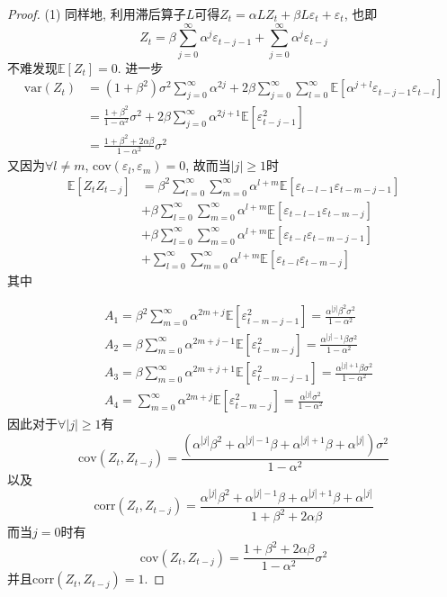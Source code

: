 \documentclass[cn,12pt,math=mtpro2,citestyle=gb7714-2015,bibstyle=gb7714-2015,twocol,mode=simple]{elegantbook}
\newcommand{\E}{\mathbb{E}}
\newcommand{\var}{\text{var}}
\begin{document}
\begin{proof}
  (1) 同样地, 利用滞后算子$L$可得$Z_t=\alpha LZ_t+\beta L\varepsilon_{t}+\varepsilon_t$, 也即
  $$Z_t=\beta\sum_{j=0}^{\infty}\alpha^j\varepsilon_{t-j-1}+\sum_{j=0}^{\infty}\alpha^j\varepsilon_{t-j}$$
  不难发现$\E[Z_t]=0$. 进一步
  \begin{align*}
  \var(Z_t)&=(1+\beta^2)\sigma^2\sum_{j=0}^{\infty}\alpha^{2j}+2\beta\sum_{j=0}^{\infty}\sum_{l=0}^{\infty}\E[\alpha^{j+l}\varepsilon_{t-j-1}\varepsilon_{t-l}] \\
  &=\frac{1+\beta^2}{1-\alpha^2}\sigma^2+2\beta\sum_{j=0}^{\infty}\alpha^{2j+1}\E[\varepsilon^2_{t-j-1}]  \\
  &=\frac{1+\beta^2+2\alpha\beta}{1-\alpha^2}\sigma^2
  \end{align*}
  又因为$\forall l\neq m$, $\text{cov}(\varepsilon_l,\varepsilon_m)=0$, 故而当$|j|\geq1$时
  \begin{align}
  \E[Z_tZ_{t-j}]&=\beta^2\sum_{l=0}^{\infty}\sum_{m=0}^{\infty}\alpha^{l+m}\E[\varepsilon_{t-l-1}\varepsilon_{t-m-j-1}] \tag{$A_1$} \\
  &+\beta\sum_{l=0}^{\infty}\sum_{m=0}^{\infty}\alpha^{l+m}\E[\varepsilon_{t-l-1}\varepsilon_{t-m-j}]\tag{$A_2$} \\
  &+\beta\sum_{l=0}^{\infty}\sum_{m=0}^{\infty}\alpha^{l+m}\E[\varepsilon_{t-l}\varepsilon_{t-m-j-1}]\tag{$A_3$} \\
  &+\sum_{l=0}^{\infty}\sum_{m=0}^{\infty}\alpha^{l+m}\E[\varepsilon_{t-l}\varepsilon_{t-m-j}] \tag{$A_4$}
  \end{align}
  其中

  \begin{align*}
  &A_1=\beta^2\sum_{m=0}^{\infty}\alpha^{2m+j}\E[\varepsilon_{t-m-j-1}^2]=\frac{\alpha^{|j|}\beta^2\sigma^2}{1-\alpha^2} \\
  &A_2=\beta\sum_{m=0}^{\infty}\alpha^{2m+j-1}\E[\varepsilon_{t-m-j}^2]=\frac{\alpha^{|j|-1}\beta\sigma^2}{1-\alpha^2} \\
  &A_3=\beta\sum_{m=0}^{\infty}\alpha^{2m+j+1}\E[\varepsilon_{t-m-j-1}^2]=\frac{\alpha^{|j|+1}\beta\sigma^2}{1-\alpha^2} \\
  &A_4=\sum_{m=0}^{\infty}\alpha^{2m+j}\E[\varepsilon_{t-m-j}^2]=\frac{\alpha^{|j|}\sigma^2}{1-\alpha^2}
  \end{align*}
  因此对于$\forall |j|\geq1$有
  $$\displaystyle\text{cov}(Z_t,Z_{t-j})=\frac{(\alpha^{|j|}\beta^2+\alpha^{|j|-1}\beta+\alpha^{|j|+1}\beta+\alpha^{|j|})\sigma^2}{1-\alpha^2}$$
  以及
  $$\text{corr}(Z_t,Z_{t-j})=\frac{\alpha^{|j|}\beta^2+\alpha^{|j|-1}\beta+\alpha^{|j|+1}\beta+\alpha^{|j|}}{1+\beta^2+2\alpha\beta}$$
  而当$j=0$时有
  $$\displaystyle\text{cov}(Z_t,Z_{t-j})=\frac{1+\beta^2+2\alpha\beta}{1-\alpha^2}\sigma^2$$
  并且$\text{corr}(Z_t,Z_{t-j})=1$.


\end{proof}
\end{document}
